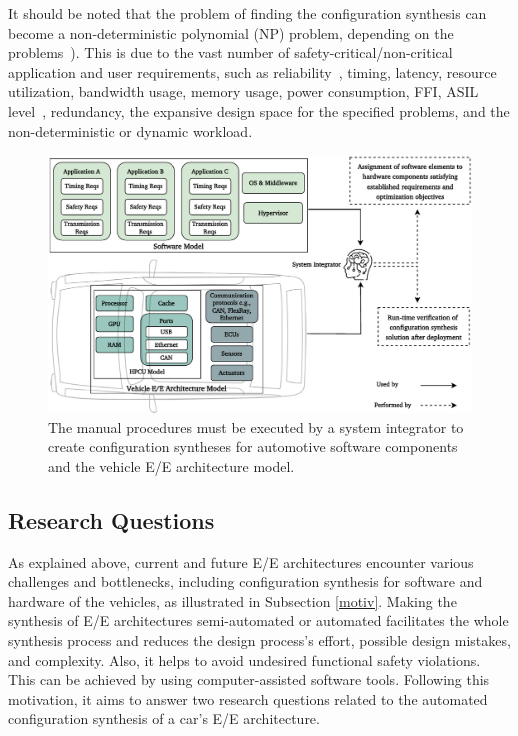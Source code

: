     
    It should be noted that the problem of finding the configuration synthesis can become a non-deterministic polynomial (NP) problem, depending on the problems~\cite{sahu2013survey,askaripoor2022architecture}). This is due to the vast number of safety-critical/non-critical application and user requirements, such as reliability~\cite{xie2017fast}, timing, latency, resource utilization, bandwidth usage, memory usage, power consumption, FFI, ASIL level~\cite{askaripoor2023designer}, redundancy, the expansive design space for the specified problems, and the non-deterministic or dynamic workload. 
        \begin{figure}[t]
    \centering
    \includegraphics[width=1\columnwidth]{figures/swhw_motiv.pdf}
    \caption{The manual procedures must be executed by a system integrator to create configuration syntheses for automotive software components and the vehicle E/E architecture model.}
    \label{fig0012}
    \end{figure}
    \subsection{Research Questions}
    As explained above, current and future E/E architectures encounter various challenges and bottlenecks, including configuration synthesis for software and hardware of the vehicles, as illustrated in Subsection \ref{motiv}. Making the synthesis of E/E architectures semi-automated or automated facilitates the whole synthesis process and reduces the design process's effort, possible design mistakes, and complexity. Also, it helps to avoid undesired functional safety violations. This can be achieved by using computer-assisted software tools. 
    Following this motivation, it aims to answer two research questions related to the automated configuration synthesis of a car's E/E architecture. 
    
